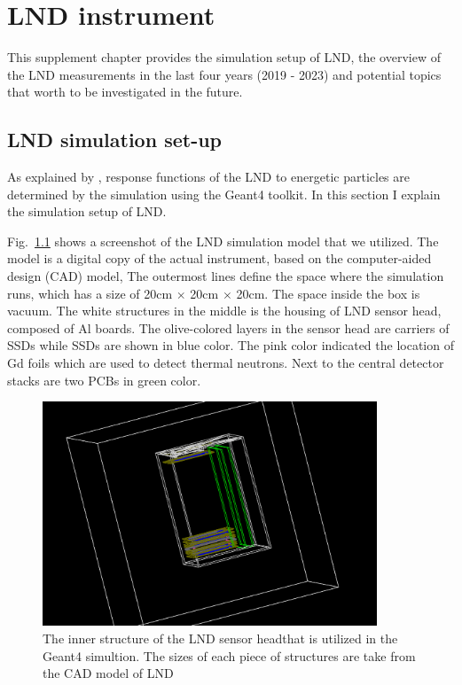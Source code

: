 \chapter{LND instrument}
\label{chp:LNDinstrument}

This supplement chapter provides the simulation setup of \ac{LND}, the overview of the \ac{LND} measurements in the last four years (2019 - 2023) and potential topics that worth to be investigated in the future.

\section*{LND simulation set-up}
\label{chp:LNDsimulation}

As explained by \citet{Wimmer-2020-LND}, response functions of the \ac{LND} to energetic particles are determined by the simulation using the \ac{Geant4} toolkit. In this section I explain the simulation setup of \ac{LND}.

Fig.~\ref{fig:LND_simulation_model} shows a screenshot of the \ac{LND} simulation model that we utilized. The model is a digital copy of the actual instrument, based on the computer-aided design (CAD) model, 
The outermost lines define the space where the simulation runs, which has a size of 20cm $\times$ 20cm $\times$ 20cm. The space inside the box is vacuum. The white structures in the middle is the housing of \ac{LND} sensor head, composed of Al boards.
The olive-colored layers in the sensor head are carriers of \acp{SSD} while \acp{SSD} are shown in blue color. The pink color indicated the location of Gd foils which are used to detect thermal neutrons. Next to the central detector stacks are two \acp{PCB} in green color.

\begin{figure}[!htb]
    \centering
    \includegraphics[width= 0.89\textwidth, height = 0.6\textwidth]{images/LND_model.png}
    \caption[The sketch of \ac{LND} sensor head]{The inner structure of the \ac{LND} sensor headthat is utilized in the \ac{Geant4} simultion. The sizes of each piece of structures are take from the CAD model of \ac{LND}}
    \label{fig:LND_simulation_model}
\end{figure}


